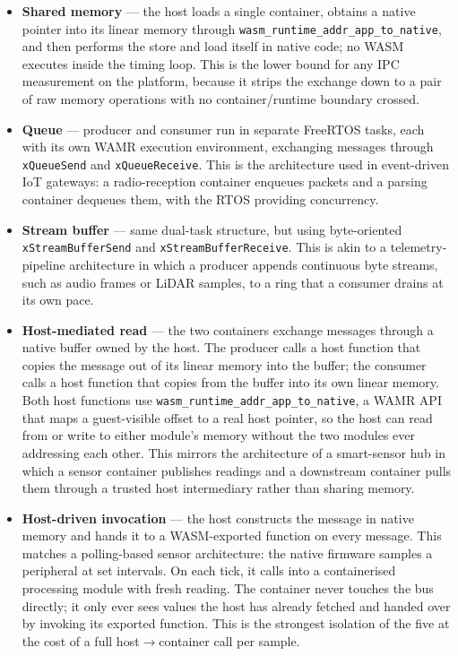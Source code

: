 \documentclass[12pt, a4paper]{report}
\begin{document}
\begin{itemize}
  \item \textbf{Shared memory} --- the host loads a single container, obtains a native pointer into its linear memory through \texttt{wasm\_runtime\_addr\_app\_to\_native}, and then performs the store and load itself in native code; no WASM executes inside the timing loop. This is the lower bound for any IPC measurement on the platform, because it strips the exchange down to a pair of raw memory operations with no container/runtime boundary crossed.

  \item \textbf{Queue} --- producer and consumer run in separate FreeRTOS tasks, each with its own WAMR execution environment, exchanging messages through \texttt{xQueueSend} and \texttt{xQueueReceive}. This is the architecture used in event-driven IoT gateways: a radio-reception container enqueues packets and a parsing container dequeues them, with the RTOS providing concurrency.

  \item \textbf{Stream buffer} --- same dual-task structure, but using byte-oriented \texttt{xStreamBufferSend} and \texttt{xStreamBufferReceive}. This is akin to a telemetry-pipeline architecture in which a producer appends continuous byte streams, such as audio frames or LiDAR samples, to a ring that a consumer drains at its own pace.

  \item \textbf{Host-mediated read} --- the two containers exchange messages through a native buffer owned by the host. The producer calls a host function that copies the message out of its linear memory into the buffer; the consumer calls a host function that copies from the buffer into its own linear memory. Both host functions use \texttt{wasm\_runtime\_addr\_app\_to\_native}, a WAMR API that maps a guest-visible offset to a real host pointer, so the host can read from or write to either module's memory without the two modules ever addressing each other. This mirrors the architecture of a smart-sensor hub in which a sensor container publishes readings and a downstream container pulls them through a trusted host intermediary rather than sharing memory.

  \item \textbf{Host-driven invocation} --- the host constructs the message in native memory and hands it to a WASM-exported function on every message. This matches a polling-based sensor architecture: the native firmware samples a peripheral at set intervals. On each tick, it calls into a containerised processing module with fresh reading. The container never touches the bus directly; it only ever sees values the host has already fetched and handed over by invoking its exported function. This is the strongest isolation of the five at the cost of a full host$\to$container call per sample.
\end{itemize}
\end{document}
